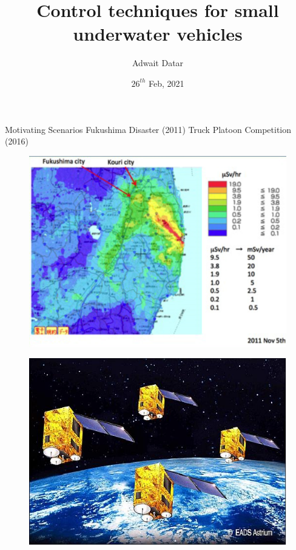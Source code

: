 \documentclass{beamer}
\title[Control techniques for small underwater vehicles]{Control techniques for small underwater vehicles}
\author{Adwait Datar}
\institute{PhD Workshop, 2021\\Technical University of Hamburg}
\date{$26^{th}$ Feb, 2021}
\begin{document}
\begin{frame}	
  \titlepage
\end{frame}

\begin{frame}{Motivating Scenarios}
	Fukushima Disaster (2011)
	\hspace{0.4 cm}
	Truck Platoon Competition (2016)
	\\
	\begin{minipage}{0.45\textwidth}	
		\begin{figure}
			\includegraphics[width=1\textwidth]{figures/fukushima_disaster.jpg}
		\end{figure}
		\begin{figure}
			\includegraphics[scale=0.2]{figures/Essaim_constellation.jpg}\label{fig:satellite_flock}

\end{figure}
\end{minipage}
\end{frame}
\end{document}
